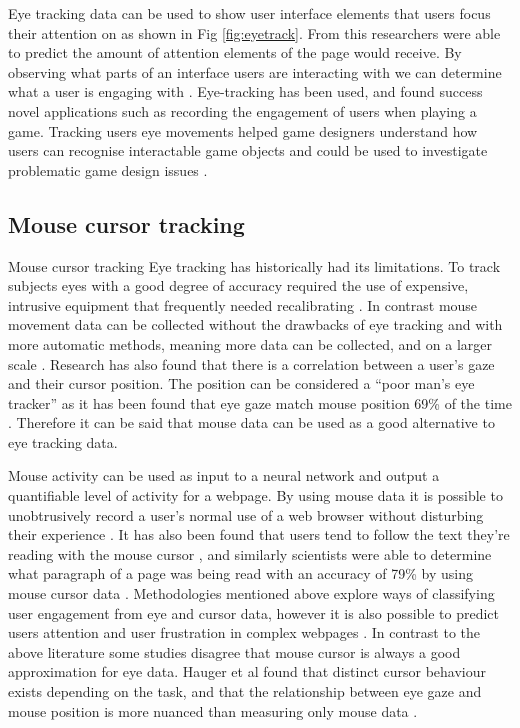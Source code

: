 \documentclass{article}
\begin{document}
Eye tracking data can be used to show user interface elements that users focus their attention on as shown in Fig \ref{fig:eyetrack}. 
From this researchers were able to predict the amount of attention elements of the page would receive. 
By observing what parts of an interface users are interacting with we can determine what a user is engaging with \cite{buscher2009you}.
Eye-tracking has been used, and found success novel applications such as recording the engagement of users when playing a game. 
Tracking users eye movements helped game designers understand how users can recognise interactable game objects and could be used to investigate problematic game design issues \cite{renshaw2009towards}.

\subsection{Mouse cursor tracking}
Mouse cursor tracking
Eye tracking has historically had its limitations. 
To track subjects eyes with a good degree of accuracy required the use of expensive, intrusive equipment that frequently needed recalibrating \cite{richardson2004eye}. 
In contrast mouse movement data can be collected without the drawbacks of eye tracking and with more automatic methods, meaning more data can be collected, and on a larger scale \cite{demvsar2017quantifying}.
Research has also found that there is a correlation between a user’s gaze and their cursor position. 
The position can be considered a ``poor man’s eye tracker'' as it has been found that eye gaze match mouse position 69\% of the time \cite{cooke2006mouse}. 
Therefore it can be said that mouse data can be used as a good alternative to eye tracking data.

Mouse activity can be used as input to a neural network and output a quantifiable level of activity for a webpage. 
By using mouse data it is possible to unobtrusively record a user’s normal use of a web browser without disturbing their experience \cite{goecks2000learning}.
It has also been found that users tend to follow the text they’re reading with the mouse cursor \cite{liu2007detecting}, and similarly scientists were able to determine what paragraph of a page was being read with an accuracy of 79\% by using mouse cursor data \cite{hauger2011using}. 
Methodologies mentioned above explore ways of classifying user engagement from eye and cursor data, however it is also possible to predict users attention and user frustration in complex webpages \cite{navalpakkam2012mouse}.
In contrast to the above literature some studies disagree that mouse cursor is always a good approximation for eye data. 
Hauger et al found that distinct cursor behaviour exists depending on the task, and that the relationship between eye gaze and mouse position is more nuanced than measuring only mouse data \cite{huang2012user}.
\end{document}

